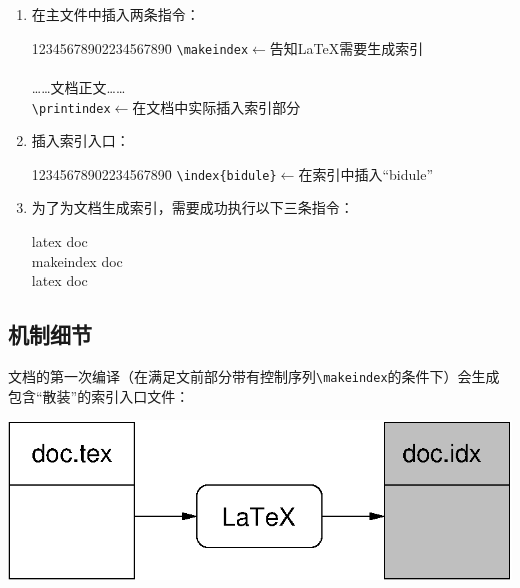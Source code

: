 \begin{enumerate}
    \item 在主文件中插入两条指令：
    \begin{dmd}
    \begin{tabbing}
12345678902234567890\=\kill
\verb|\makeindex|\>\textsf{$\leftarrow$告知\LaTeX 需要生成索引}\\
\verb||\\
{\rmfamily ……文档正文……}\\
\verb|\printindex|\>\textsf{$\leftarrow$在文档中实际插入索引部分}\\
\verb||
    \end{tabbing}
    \end{dmd}

    \item 插入索引入口：
\begin{dmd}
\begin{tabbing}
12345678902234567890\=\kill
\verb|\index{bidule}|\>\textsf{$\leftarrow$在索引中插入``bidule''}
\end{tabbing}
\end{dmd}

    \item 为了为文档生成索引，需要成功执行以下三条指令：
    
    \begin{dmd}
        latex doc\\makeindex doc\\latex doc
    \end{dmd}
\end{enumerate}

\subsection{机制细节}

文档的第一次编译（在满足文前部分带有控制序列\verb|\makeindex|的条件下）会生成包含``散装''的索引入口文件：

\begin{center}
    \includegraphics{img/makeindex1}
\end{center}

